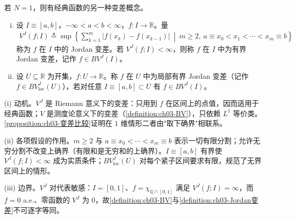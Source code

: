 \documentclass[../../main.tex]{subfiles}%
\begin{document}
若 $N=1$，则有经典函数的另一种变差概念。

\begin{definition}\label{definition:ch03-Jordan变差}
\begin{enumerate}[(i)]
\item 设 $I\equiv[a,b]$，$-\infty<a<b<\infty$，$f:I\to\mathbb{R}$。量
\begin{align}
V^J(f;I)\triangleq \sup\left\{\sum_{k=1}^m|f(x_k)-f(x_{k-1})|\ \middle|\ m\geqslant2,\ a\equiv x_0<x_1<\cdots<x_m\equiv b\right\}\label{align:ch03-3.14}
\end{align}
称为 $f$ 在 $I$ 中的 Jordan 变差。若 $V^J(f;I)<\infty$，则称 $f$ 在 $I$ 中为有界 Jordan 变差，记作 $f\in BV^J(I)$。
\item 设 $U\subseteq\mathbb{R}$ 为开集，$f:U\to\mathbb{R}$。称 $f$ 在 $U$ 中为局部有界 Jordan 变差（记作 $f\in BV^J_{\mathrm{loc}}(U)$），若对任意 $I\equiv[a,b]\subset U$ 有 $f\in BV^J(I)$。
\end{enumerate}
\end{definition}

\begin{remark}\label{remark:ch03-Jordan变差动机}
(i) 动机。$V^J$ 是 Riemann 意义下的变差：只用到 $f$ 在区间上的点值，因而适用于经典函数；$V$ 是测度论意义下的变差（\cref{definition:ch03-BV}），只依赖 $L^1$ 等价类。\cref{proposition:ch03-变差比较}证明在 $1$ 维情形二者由"取下确界"相联系。

(ii) 各项假设的作用。$m\geqslant2$ 与 $a\equiv x_0<\cdots<x_m\equiv b$ 表示一切有限分割；允许无穷分割不改变上确界（有限和是无穷和的上确界）。$I\equiv[a,b]$ 有界使 $V^J(f;I)<\infty$ 成为实质条件；$BV^J_{\mathrm{loc}}(U)$ 对每个紧子区间要求有限，规范了无界区间上的情形。

(iii) 边界。$V^J$ 对代表敏感：$I=[0,1]$、$f=\chi_{\mathbb{Q}\cap[0,1]}$ 满足 $V^J(f;I)=\infty$，而 $f=0$ a.e.、零函数的 $V^J$ 为 $0$，故\cref{definition:ch03-BV}与\cref{definition:ch03-Jordan变差}不可逐字等同。
\end{remark}
\end{document}
